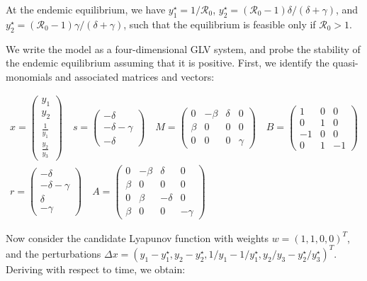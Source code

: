 \documentclass{article}
\begin{document}
At the endemic equilibrium, we have \(y_1^\star = 1 / \mathcal R_0\),
\(y_2^\star = (\mathcal R_0 - 1) \delta / (\delta + \gamma)\), and
\(y_2^\star = (\mathcal R_0 - 1) \gamma / (\delta + \gamma)\), such that
the equilibrium is feasible only if \(\mathcal R_0 >1\).

We write the model as a four-dimensional GLV system, and probe the
stability of the endemic equilibrium assuming that it is positive.
First, we identify the quasi-monomials and associated matrices and
vectors:

\begin{equation}
\begin{aligned}
x = \begin{pmatrix}
y_1\\
y_2\\
\frac{1}{y_1}\\
\frac{y_2}{y_3}
\end{pmatrix}
\quad
s = \begin{pmatrix}
-\delta \\
-\delta - \gamma \\
-\delta
\end{pmatrix}
\quad
M = \begin{pmatrix}
0 & -\beta & \delta & 0\\
\beta & 0 & 0 & 0 \\
0 & 0 & 0 & \gamma
\end{pmatrix}
\quad
B = \begin{pmatrix}
1 & 0 & 0\\
0 & 1 & 0\\
-1 & 0 & 0\\
0 & 1 & -1
\end{pmatrix}
\\
r = \begin{pmatrix}
-\delta \\
-\delta - \gamma \\
\delta\\
-\gamma
\end{pmatrix}
\quad 
A = \begin{pmatrix}
0 & -\beta & \delta & 0 \\
\beta & 0 & 0 & 0\\
0 & \beta & -\delta & 0 \\
\beta & 0 & 0 & -\gamma
\end{pmatrix}
\end{aligned}
\end{equation}

Now consider the candidate Lyapunov function with weights
\(w = (1,1,0,0)^T\), and the perturbations
\(\Delta x = (y_1 - y_1^\star, y_2 - y_2^\star, 1/y_1 - 1 / y_1^\star, y_2 / y_3 - y_2^\star / y_3^\star)^T\).
Deriving with respect to time, we obtain:
\end{document}
